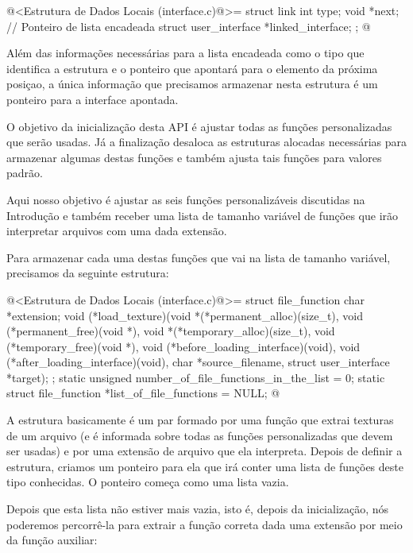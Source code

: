 \iniciocodigo
@<Estrutura de Dados Locais (interface.c)@>=
struct link {
  int type;
  void *next; // Ponteiro de lista encadeada
  struct user_interface *linked_interface;
};
@
\fimcodigo

Além das informações necessárias para a lista encadeada como o tipo
que identifica a estrutura e o ponteiro que apontará para o elemento
da próxima posiçao, a única informação que precisamos armazenar nesta
estrutura é um ponteiro para a interface apontada.


O objetivo da inicialização desta API é ajustar todas as funções
personalizadas que serão usadas. Já a finalização desaloca as
estruturas alocadas necessárias para armazenar algumas destas funções
e também ajusta tais funções para valores padrão.


Aqui nosso objetivo é ajustar as seis funções personalizáveis
discutidas na Introdução e também receber uma lista de tamanho
variável de funções que irão interpretar arquivos com uma dada
extensão.

Para armazenar cada uma destas funções que vai na lista de tamanho
variável, precisamos da seguinte estrutura:

\iniciocodigo
@<Estrutura de Dados Locais (interface.c)@>=
struct file_function {
  char *extension;
  void (*load_texture)(void *(*permanent_alloc)(size_t),
                      void (*permanent_free)(void *),
                      void *(*temporary_alloc)(size_t),
                      void (*temporary_free)(void *),
                      void (*before_loading_interface)(void),
                      void (*after_loading_interface)(void),
                      char *source_filename, struct user_interface *target);
};
static unsigned number_of_file_functions_in_the_list = 0;
static struct file_function *list_of_file_functions = NULL;
@
\fimcodigo

A estrutura basicamente é um par formado por uma função que extrai
texturas de um arquivo (e é informada sobre todas as funções
personalizadas que devem ser usadas) e por uma extensão de arquivo que
ela interpreta. Depois de definir a estrutura, criamos um ponteiro
para ela que irá conter uma lista de funções deste tipo conhecidas. O
ponteiro começa como uma lista vazia.

Depois que esta lista não estiver mais vazia, isto é, depois da
inicialização, nós poderemos percorrê-la para extrair a função correta
dada uma extensão por meio da função auxiliar:

